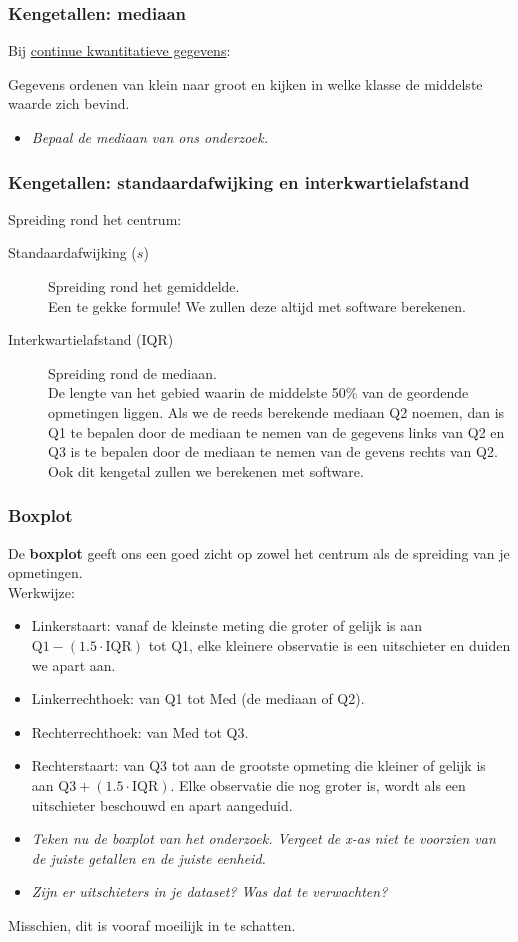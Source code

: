 \documentclass[dutch]{beamer}
\newcommand{\vraag}[1]{\begin{itemize}\item[Vraag:] {\it #1}\end{itemize}}
\begin{document}
\begin{frame}
\frametitle{Kengetallen: mediaan}
Bij \underline{continue kwantitatieve gegevens}:\\
\begin{description}
\scriptsize
  \item[mediaan:] Gegevens ordenen van klein naar groot en kijken in welke klasse de middelste waarde zich bevind.
\end{description}
\pause
\vraag{Bepaal de mediaan van ons onderzoek.}
\vspace*{10cm}
\end{frame}

\begin{frame}
\frametitle{Kengetallen: standaardafwijking en interkwartielafstand}
Spreiding rond het centrum:\\
\pause
\begin{description}
  \item[Standaardafwijking ($s$)] Spreiding rond het gemiddelde.\\
  Een te gekke formule! We zullen deze altijd met software berekenen.
  \pause
  \item[Interkwartielafstand (IQR)] Spreiding rond de mediaan.\\
  De lengte van het gebied waarin de middelste 50\% van de geordende opmetingen liggen. Als we de reeds berekende mediaan Q2 noemen, dan is Q1 te bepalen door de mediaan te nemen van de gegevens links van Q2 en Q3 is te bepalen door de mediaan te nemen van de gevens rechts van Q2. Ook dit kengetal zullen we berekenen met software.
\end{description}
\end{frame}

\begin{frame}
  \frametitle{Boxplot}
  De {\bf boxplot} geeft ons een goed zicht op zowel het centrum als de spreiding van je opmetingen.\\
  Werkwijze:
  \begin{itemize}
    \item Linkerstaart: vanaf de kleinste meting die groter of gelijk is aan $\mbox{Q1} - (1.5\cdot\mbox{IQR})$ tot Q1, elke kleinere observatie is een uitschieter en duiden we apart aan.
    \item Linkerrechthoek: van Q1 tot Med (de mediaan of Q2).
    \item Rechterrechthoek: van Med tot Q3.
    \item Rechterstaart: van Q3 tot aan de grootste opmeting die kleiner of gelijk is aan $\mbox{Q3} + (1.5\cdot\mbox{IQR})$. Elke observatie die nog groter is, wordt als een uitschieter beschouwd en apart aangeduid.
  \end{itemize}
\pause
\vraag{Teken nu de boxplot van het onderzoek. Vergeet de x-as niet te voorzien van de juiste getallen en de juiste
eenheid.}
\pause
\vraag{Zijn er uitschieters in je dataset? Was dat te verwachten?}
\pause
Misschien, dit is vooraf moeilijk in te schatten.
\end{frame}
\end{document}
